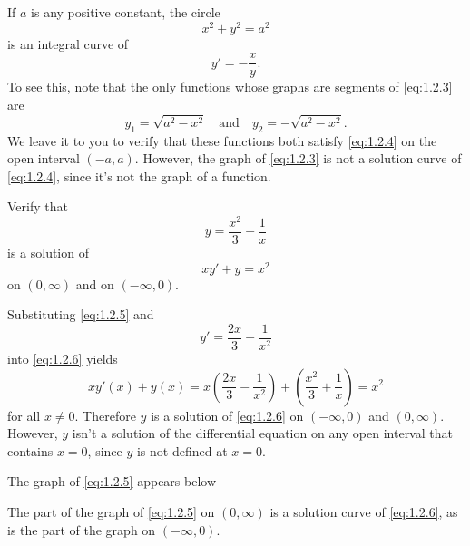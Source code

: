 \documentclass{ximera}
\begin{document}
\begin{example}
\label{example:1.2.1}
If $a$ is any positive constant,  the circle
\begin{equation} \label{eq:1.2.3}
x^2+y^2=a^2
\end{equation}
is an integral curve of
\begin{equation} \label{eq:1.2.4}
y'=-\frac{x}{y}.
\end{equation}
To see this, note that the only functions whose graphs are segments of
\eqref{eq:1.2.3} are
$$
y_1=\sqrt{a^2-x^2}\quad\text{and}\quad y_2=-\sqrt{a^2-x^2}.
$$
We leave it to you to verify that these functions both satisfy
\eqref{eq:1.2.4} on the open interval $(-a,a)$. However, the graph of \eqref{eq:1.2.3} is
not a solution
curve of \eqref{eq:1.2.4}, since it's not the graph of a function.
\end{example}

\begin{example}\label{example:1.2.2}
Verify that
\begin{equation} \label{eq:1.2.5}
y=\frac{x^2}{3}+\frac{1}{x}
\end{equation}
is a solution of
\begin{equation} \label{eq:1.2.6}
xy'+y=x^2
\end{equation}
 on $(0,\infty)$ and on $(-\infty,0)$.
 
\begin{explanation}
Substituting \eqref{eq:1.2.5} and
$$
y'=\frac{2x}{3} - \frac{1}{x^2}
$$
into \eqref{eq:1.2.6}  yields
$$
xy'(x)+y(x)=x \left(\frac{2x}{3} - \frac{1}{x^2}\right)+
\left(\frac{x^2}{3}+\frac{1}{x}\right)=x^2
$$
for all $x\neq 0$. Therefore $y$ is a solution of \eqref{eq:1.2.6}
on $(-\infty,0)$ and $(0,\infty)$.
 However, $y$ isn't  a solution of the differential
equation on any open interval that contains $x=0$, since  $y$ is
not defined at  $x=0$.

The graph of \eqref{eq:1.2.5} appears below


The part
of the graph of \eqref{eq:1.2.5} on $(0,\infty)$ is a solution curve of
\eqref{eq:1.2.6}, as is the part of the graph on $(-\infty,0)$.
\end{explanation}
\end{example}
\end{document}
